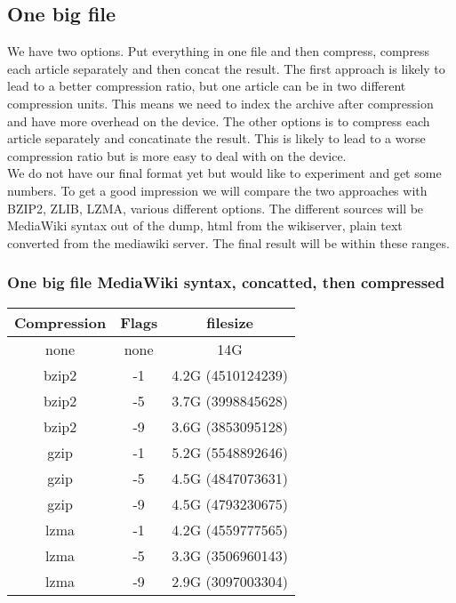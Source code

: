 \documentclass{article}
\begin{document}
\subsection{One big file}
We have two options. Put everything in one file and then compress, compress each article separately and then concat the result. The first approach is likely to lead to a better compression ratio, but one article can be in two different compression units. This means we need to index the archive after compression and have more overhead on the device. The other options is to compress each article separately and concatinate the result. This is likely to lead to a worse compression ratio but is more easy to deal with on the device.\\
We do not have our final format yet but would like to experiment and get some numbers. To get a good impression we will compare the two approaches with BZIP2, ZLIB, LZMA, various different options. The different sources will be MediaWiki syntax out of the dump, html from the wikiserver, plain text converted from the mediawiki server. The final result will be within these ranges.

\subsubsection{One big file MediaWiki syntax, concatted, then compressed}
\begin{tabular}{|c|c|c|}
\hline
Compression & Flags & filesize \\ \hline
none & none & 14G \\ \hline
bzip2 & -1 & 4.2G (4510124239) \\ \hline
bzip2 & -5 & 3.7G (3998845628) \\ \hline
bzip2 & -9 & 3.6G (3853095128) \\ \hline
gzip  & -1 & 5.2G (5548892646) \\ \hline
gzip  & -5 & 4.5G (4847073631) \\ \hline
gzip  & -9 & 4.5G (4793230675) \\ \hline
lzma  & -1 & 4.2G (4559777565) \\ \hline
lzma  & -5 & 3.3G (3506960143) \\ \hline
lzma  & -9 & 2.9G (3097003304) \\ \hline
\end{tabular}
\end{document}
